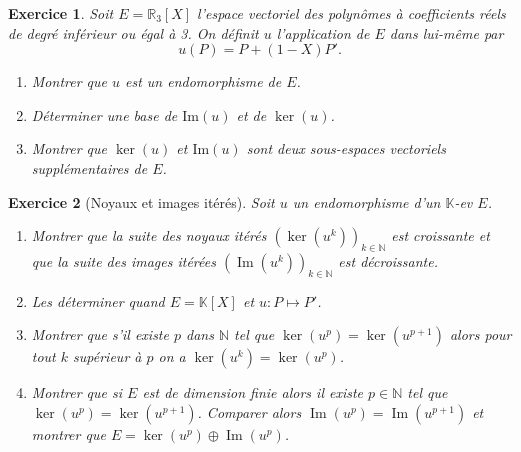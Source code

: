\documentclass[12pt,a4paper]{article}
\newcommand{\N}{\mathbb{N}}
\newcommand{\K}{\mathbb{K} }
\DeclareMathOperator{\Ima }{Im}
\theoremstyle{break}
\theoremstyle{break}
\newtheorem{Exo}{Exercice}
\begin{document}
%
\begin{Exo}
	Soit $E=\mathbb R_3[X]$ l'espace vectoriel des polynômes à coefficients réels de degré inférieur ou égal à 3.
	On définit $u$ l'application de $E$ dans lui-même par
	$$u(P)=P+(1-X)P'.$$
	\begin{enumerate}
		\item Montrer que $u$ est un endomorphisme de $E$.
		\item Déterminer une base de $\textrm{Im}(u)$ et de $\ker(u)$.
		\item Montrer que $\ker(u)$ et $\textrm{Im}(u)$ sont deux sous-espaces
		vectoriels supplémentaires de $E$.
	\end{enumerate}
\end{Exo}
%

\begin{Exo}[Noyaux et images itérés]
	Soit $u$ un endomorphisme d'un $\K$-ev $E$.
	\begin{enumerate}
		\item
		Montrer que la suite des noyaux itérés $\left(\ker(u^k)\right)_{k\in\N}$ est croissante et que la suite des images itérées $\left(\Ima(u^k)\right)_{k\in\N}$ est décroissante.
		\item
		Les déterminer quand $E=\K[X]$ et $u:P\mapsto P'$.
		\item
		Montrer que s'il existe $p$ dans $\N$ tel que $\ker(u^p)=\ker(u^{p+1})$ alors pour tout $k$ supérieur à $p$ on a $\ker(u^k)=\ker(u^p)$.
		\item
		Montrer que si $E$ est de dimension finie alors il existe $p\in\N$ tel que $\ker(u^p)=\ker(u^{p+1})$. Comparer alors $\Ima(u^p)=\Ima(u^{p+1})$ et montrer que $E=\ker(u^p)\oplus \Ima(u^p)$.
	\end{enumerate}
\end{Exo}
\end{document}
